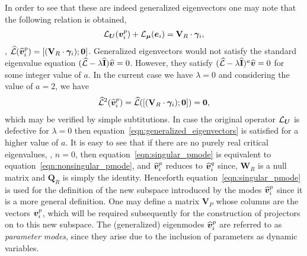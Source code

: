 In order to see that these are indeed generalized eigenvectors one may note that the following relation is obtained,
\begin{eqnarray}
	\mathcal{L}_{\boldsymbol{U}}(\boldsymbol{v}^{p}_{i}) + \mathcal{L}_{\boldsymbol{\mu}}(\boldsymbol{e}_{i}) = \mathbf{V}_{R}\cdot\boldsymbol{\gamma}_{i},
\end{eqnarray}
\ie, $\mathcal{\widehat{L}}({\widehat{\boldsymbol{v}}}^{p}_{i}) = [(\mathbf{V}_{R}\cdot\boldsymbol{\gamma}_{i}); \boldsymbol{0}]$. Generalized eigenvectors would not satisfy the standard eigenvalue equation $(\mathcal{\widehat{L}} - \lambda\mathbf{\widehat{I}}){\widehat{\boldsymbol{v}}} = 0$. However, they satisfy $(\mathcal{\widehat{L}} - \lambda\mathbf{\widehat{I}})^{a}{\widehat{\boldsymbol{v}}} = 0$ for some integer value of $a$. In the current case we have $\lambda = 0$ and considering the value of $a=2$, we have
\begin{eqnarray}
	\label{eqn:generalized_eigenvectors}
	\mathcal{\widehat{L}}^{2}({\widehat{\boldsymbol{v}}}^{p}_{i}) = \mathcal{\widehat{L}}([(\mathbf{V}_{R}\cdot\boldsymbol{\gamma}_{i}); \boldsymbol{0}]) = \boldsymbol{0},
\end{eqnarray}
which may be verified by simple subtitutions. In case the original operator $\mathcal{L}_{\boldsymbol{U}}$ is defective for $\lambda = 0$ then equation~\eqref{eqn:generalized_eigenvectors} is satisfied for a higher value of $a$. 
It is easy to see that if there are no purely real critical eigenvalues, \ie, $n = 0$, then equation~\eqref{eqn:singular_pmode} is equivalent to equation~\eqref{eqn:nonsingular_pmode}, and ${\widehat{\boldsymbol{v}}}^{p}_{i}$ reduces to ${\widehat{\boldsymbol{v}}}^{q}_{i}$ since, $\mathbf{W}_{R}$ is a null matrix and $\mathbf{Q}_{R}$ is simply the identity. Henceforth equation~\eqref{eqn:singular_pmode} is used for the definition of the new subspace introduced by the modes ${\widehat{\boldsymbol{v}}}^{p}_{i}$ since it is a more general definition. One may define a matrix $\mathbf{V}_{P}$ whose columns are the vectors $\boldsymbol{v}^{p}_{i}$, which will be required subsequently for the construction of projectors on to this new subspace. The (generalized) eigenmodes ${\widehat{\boldsymbol{v}}}^{p}_{i}$ are referred to as \emph{parameter modes}, since they arise due to the inclusion of parameters as dynamic variables.

